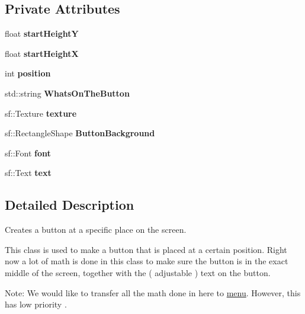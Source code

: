 \subsection*{Private Attributes}
\begin{DoxyCompactItemize}
\item 
\mbox{\label{class_button_afe532ea0d5dd3fea5341ba1cb3e64e0b}} 
float {\bfseries start\+HeightY}
\item 
\mbox{\label{class_button_a954fb7025b688b7b2a4d8d16adca74eb}} 
float {\bfseries start\+HeightX}
\item 
\mbox{\label{class_button_a6853c434f05010c4b2582fb757f96bef}} 
int {\bfseries position}
\item 
\mbox{\label{class_button_a960b5ee6c11f9385763838b1d788f010}} 
std\+::string {\bfseries Whats\+On\+The\+Button}
\item 
\mbox{\label{class_button_aa0cf48f8db00201090fbbd702ee81fb9}} 
sf\+::\+Texture {\bfseries texture}
\item 
\mbox{\label{class_button_aa1deb9c76ee0c386f30ab4771e70af1f}} 
sf\+::\+Rectangle\+Shape {\bfseries Button\+Background}
\item 
\mbox{\label{class_button_ab6290d275363f4b0e133eec450845ca1}} 
sf\+::\+Font {\bfseries font}
\item 
\mbox{\label{class_button_aadf908b0777f2ae5c28d949fda3384c1}} 
sf\+::\+Text {\bfseries text}
\end{DoxyCompactItemize}


\subsection{Detailed Description}
Creates a button at a specific place on the screen. 

This class is used to make a button that is placed at a certain position. Right now a lot of math is done in this class to make sure the button is in the exact middle of the screen, together with the ( adjustable ) text on the button.

Note\+: We would like to transfer all the math done in here to \hyperlink{classmenu}{menu}. However, this has low priority .

